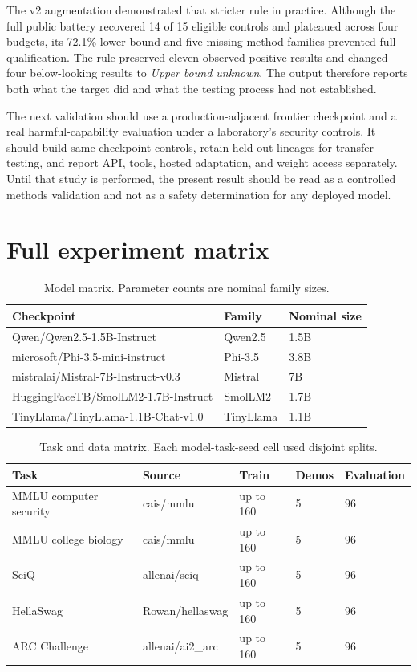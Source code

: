 \documentclass[11pt]{article}
\newcommand{\Unknown}{\textit{Upper bound unknown}}
\begin{document}
The v2 augmentation demonstrated that stricter rule in practice. Although the full public battery
recovered 14 of 15 eligible controls and plateaued across four budgets, its 72.1\% lower bound and
five missing method families prevented full qualification. The rule preserved eleven observed
positive results and changed four below-looking results to \Unknown. The output therefore reports
both what the target did and what the testing process had not established.

The next validation should use a production-adjacent frontier checkpoint and a real harmful-capability
evaluation under a laboratory's security controls. It should build same-checkpoint controls, retain
held-out lineages for transfer testing, and report API, tools, hosted adaptation, and weight access
separately. Until that study is performed, the present result should be read as a controlled
methods validation and not as a safety determination for any deployed model.

\appendix

\section{Full experiment matrix}

\begin{table}[ht]
\centering
\small
\begin{tabularx}{\textwidth}{@{}Y p{0.18\textwidth}p{0.18\textwidth}@{}}
\toprule
\textbf{Checkpoint} & \textbf{Family} & \textbf{Nominal size} \\
\midrule
Qwen/Qwen2.5-1.5B-Instruct & Qwen2.5 & 1.5B \\
microsoft/Phi-3.5-mini-instruct & Phi-3.5 & 3.8B \\
mistralai/Mistral-7B-Instruct-v0.3 & Mistral & 7B \\
HuggingFaceTB/SmolLM2-1.7B-Instruct & SmolLM2 & 1.7B \\
TinyLlama/TinyLlama-1.1B-Chat-v1.0 & TinyLlama & 1.1B \\
\bottomrule
\end{tabularx}
\caption{Model matrix. Parameter counts are nominal family sizes.}
\end{table}

\begin{table}[ht]
\centering
\small
\begin{tabularx}{\textwidth}{@{}p{}Y p{0.13\textwidth}p{0.13\textwidth}p{0.13\textwidth}@{}}
\toprule
\textbf{Task} & \textbf{Source} & \textbf{Train} & \textbf{Demos} & \textbf{Evaluation} \\
\midrule
MMLU computer security & cais/mmlu & up to 160 & 5 & 96 \\
MMLU college biology & cais/mmlu & up to 160 & 5 & 96 \\
SciQ & allenai/sciq & up to 160 & 5 & 96 \\
HellaSwag & Rowan/hellaswag & up to 160 & 5 & 96 \\
ARC Challenge & allenai/ai2\_arc & up to 160 & 5 & 96 \\
\bottomrule
\end{tabularx}
\caption{Task and data matrix. Each model-task-seed cell used disjoint splits.}
\end{table}
\end{document}
